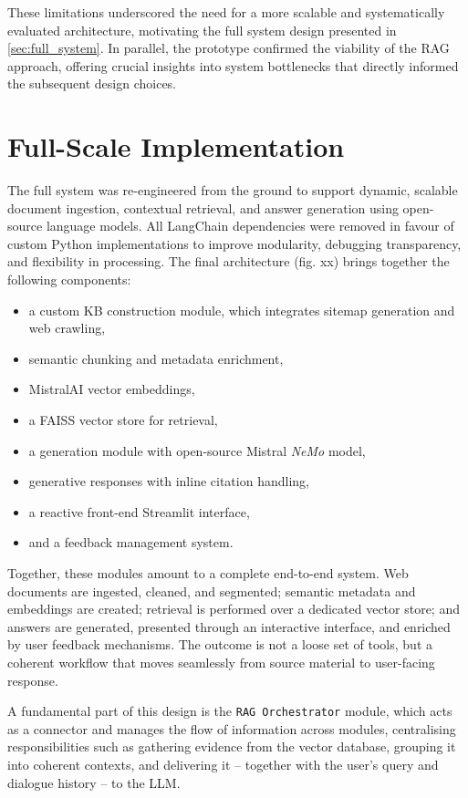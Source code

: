 \begin{spacing}{1.5}
These limitations underscored the need for a more scalable and systematically evaluated architecture, motivating the full system design presented in \autoref{sec:full_system}. In parallel, the prototype confirmed the viability of the RAG approach, offering crucial insights into system bottlenecks that directly informed the subsequent design choices.


\section{Full-Scale Implementation}\label{sec:full_system}
The full system was re-engineered from the ground to support dynamic, scalable document ingestion, contextual retrieval, and answer generation using open-source language models. All LangChain dependencies were removed in favour of custom Python implementations to improve modularity, debugging transparency, and flexibility in processing. The final architecture (fig. xx) brings together the following components:
\begin{itemize}
      \item a custom KB construction module, which integrates sitemap generation and web crawling,
      \item semantic chunking and metadata enrichment,
      \item MistralAI vector embeddings,
      \item a FAISS vector store for retrieval,
      \item a generation module with open-source Mistral \textit{NeMo} model,
      \item generative responses with inline citation handling,
      \item a reactive front-end Streamlit interface,
      \item and a feedback management system.
\end{itemize}

Together, these modules amount to a complete end-to-end system. Web documents are ingested, cleaned, and segmented; semantic metadata and embeddings are created; retrieval is performed over a dedicated vector store; and answers are generated, presented through an interactive interface, and enriched by user feedback mechanisms. The outcome is not a loose set of tools, but a coherent workflow that moves seamlessly from source material to user-facing response.

A fundamental part of this design is the \texttt{RAG Orchestrator} module, which acts as a connector and manages the flow of information across modules, centralising responsibilities such as gathering evidence from the vector database, grouping it into coherent contexts, and delivering it -- together with the user’s query and dialogue history -- to the LLM.


\end{spacing}
